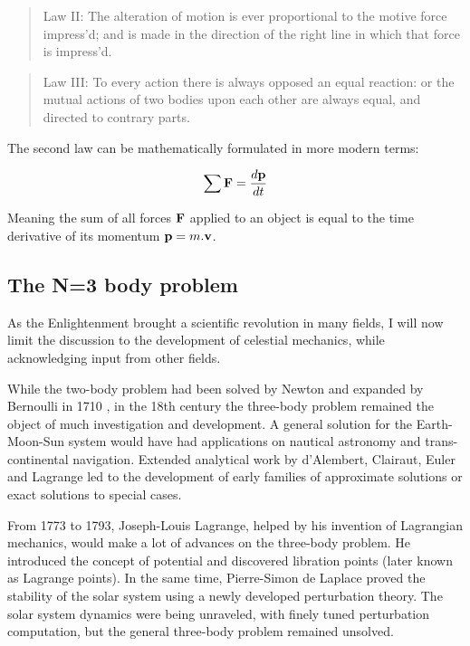 \begin{quote}
Law II: The alteration of motion is ever proportional to the motive force impress'd; and is made in the direction of the right line in which that force is impress'd.
\end{quote}
 
 \begin{quote}
 Law III: To every action there is always opposed an equal reaction: or the mutual actions of two bodies upon each other are always equal, and directed to contrary parts.
 \end{quote}

The second law can be mathematically formulated in more modern terms:

\begin{equation}
\sum \bold{F} = \frac{d \bold{p}}{dt}
\end{equation}

Meaning the sum of all forces $\bold{F}$ applied to an object is equal to the time derivative of its momentum $\bold{p} = m.\bold{v}$.



\subsection*{The N=3 body problem}

As the Enlightenment brought a scientific revolution in many fields, I will now limit the discussion to the development of celestial mechanics, while acknowledging input from other fields.

While the two-body problem had been solved by Newton and expanded by Bernoulli in 1710 \citep{Barrow1997}, in the 18th century the three-body problem remained the object of much investigation and development. A general solution for the Earth-Moon-Sun system would have had applications on nautical astronomy and trans-continental navigation. Extended analytical work by d'Alembert, Clairaut, Euler and Lagrange led to the development of early families of approximate solutions or exact solutions to special cases.

From 1773 to 1793, Joseph-Louis Lagrange, helped by his invention of Lagrangian mechanics, would make a lot of advances on the three-body problem. He introduced the concept of potential and discovered libration points (later known as Lagrange points). In the same time, Pierre-Simon de Laplace proved the stability of the solar system using a newly developed perturbation theory. The solar system dynamics were being unraveled, with finely tuned perturbation computation, but the general three-body problem remained unsolved.

